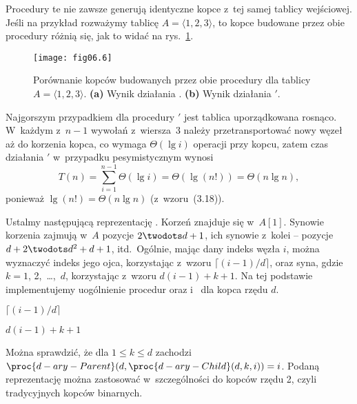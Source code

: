 \problems


\subproblem %
Procedury te nie zawsze generują identyczne kopce z~tej samej tablicy wejściowej. Jeśli na przykład rozważymy tablicę $A=\langle1,2,3\rangle$, to kopce budowane przez obie procedury różnią się, jak to widać na rys.~\ref{fig:6-1(a)}.
\begin{figure}[ht]
	\begin{center}
		\texttt{[image: fig06.6]}
	\end{center}
	\caption{Porównanie kopców budowanych przez obie procedury dla tablicy $A=\langle1,2,3\rangle$. {\sffamily\bfseries(a)} Wynik działania . {\sffamily\bfseries(b)} Wynik działania $'$.} \label{fig:6-1(a)}
\end{figure}

\subproblem %
Najgorszym przypadkiem dla procedury $'$ jest tablica uporządkowana rosnąco. W~każdym z~$n-1$ wywołań  z~wiersza~3 należy przetransportować nowy węzeł aż do korzenia kopca, co wymaga $\Theta(\lg i)$ operacji przy  kopcu, zatem czas działania $'$ w~przypadku pesymistycznym wynosi
\[
	T(n) = \sum_{i=1}^{n-1}\Theta(\lg i) = \Theta(\lg(n!)) = \Theta(n\lg n),
\]
ponieważ $\lg(n!)=\Theta(n\lg n)$ (z~wzoru~(3.18)).


\subproblem %
Ustalmy następującą reprezentację . Korzeń znajduje się w~$A[1]$. Synowie korzenia zajmują w~$A$ pozycje $2\twodots d+1$, ich synowie z~kolei -- pozycje $d+2\twodots d^2+d+1$, itd.\ Ogólnie, mając dany indeks węzła $i$, można wyznaczyć indeks jego ojca, korzystając z~wzoru $\lceil(i-1)/d\rceil$, oraz  syna, gdzie $k=1$, 2,~\dots,~$d$, korzystając z~wzoru $d(i-1)+k+1$. Na tej podstawie implementujemy uogólnienie procedur  oraz  i~ dla kopca rzędu $d$.
\begin{codebox}
\zi	\Return $\lceil(i-1)/d\rceil$
\end{codebox}
\begin{codebox}
\zi	\Return $d(i-1)+k+1$
\end{codebox}

Można sprawdzić, że dla $1\le k\le d$ zachodzi $\proc{d-ary-Parent}(d,\proc{d-ary-Child}(d,k,i))=i$. Podaną reprezentację można zastosować w~szczególności do kopców rzędu 2, czyli tradycyjnych kopców binarnych.


